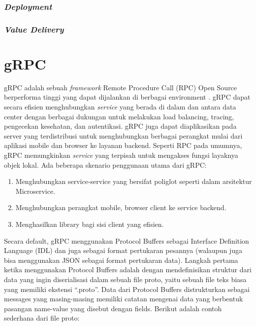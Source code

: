 \subsubsection{\textit{Deployment}}

\subsubsection{\textit{Value Delivery}}


\section{gRPC}
gRPC adalah sebuah \textit{framework} Remote Procedure Call (RPC) Open Source berperforma tinggi yang dapat dijalankan di berbagai environment \citep{grpc}.
gRPC dapat secara efisien menghubungkan \textit{service} yang berada di dalam dan antara data center dengan berbagai dukungan untuk melakukan load balancing, tracing, pengecekan kesehatan, dan autentikasi.
gRPC juga dapat diaplikasikan pada server yang terdistribusi untuk menghubungkan berbagai perangkat mulai dari aplikasi mobile dan browser ke layanan backend.
Seperti RPC pada umumnya, gRPC memungkinkan \textit{service} yang terpisah untuk mengakses fungsi layaknya objek lokal. Ada beberapa skenario penggunaan utama dari gRPC:
\begin{enumerate}
	\item Menghubungkan service-service yang bersifat poliglot seperti dalam arsitektur Microservice.
	\item Menghubungkan perangkat mobile, browser client ke service backend.
	\item Menghasilkan library bagi sisi client yang efisien.
\end{enumerate}

Secara default, gRPC menggunakan Protocol Buffers sebagai Interface Definition Language (IDL) dan juga sebagai format pertukaran pesannya (walaupun juga bisa menggunakan JSON sebagai format pertukaran data).
Langkah pertama ketika menggunakan Protocol Buffers adalah dengan mendefinisikan struktur dari data yang ingin diserialisasi dalam sebuah file proto, yaitu sebuah file teks biasa yang memiliki ekstensi “.proto”.
Data dari Protocol Buffers distrukturkan sebagai messages yang masing-masing memiliki catatan mengenai data yang berbentuk pasangan name-value yang disebut dengan fields.
Berikut adalah contoh sederhana dari file proto:



